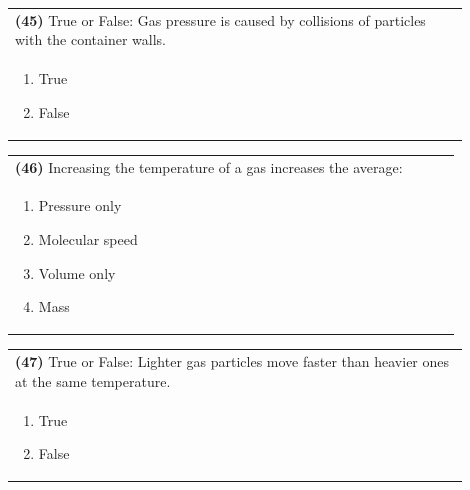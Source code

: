 \documentclass{article}
\begin{document}
\newpage

\noindent\begin{tabular}{|p{0.9\linewidth}|}
\hline
\textbf{(45)} True or False: Gas pressure is caused by collisions of particles with the container walls.\\[0.2cm]

\begin{minipage}[t]{0.85\linewidth}
\begin{enumerate}[label=\alph*.]
\item True
\item False
\end{enumerate}
\end{minipage}\\[0.2cm]
\hline
\end{tabular}

\vspace{0.2cm}
\noindent\begin{tabular}{|p{0.9\linewidth}|}
\hline
\textbf{(46)} Increasing the temperature of a gas increases the average:\\[0.2cm]

\begin{minipage}[t]{0.85\linewidth}
\begin{enumerate}[label=\alph*.]
\item Pressure only
\item Molecular speed
\item Volume only
\item Mass
\end{enumerate}
\end{minipage}\\[0.2cm]
\hline
\end{tabular}

\vspace{0.2cm}
\noindent\begin{tabular}{|p{0.9\linewidth}|}
\hline
\textbf{(47)} True or False: Lighter gas particles move faster than heavier ones at the same temperature.\\[0.2cm]

\begin{minipage}[t]{0.85\linewidth}
\begin{enumerate}[label=\alph*.]
\item True
\item False
\end{enumerate}
\end{minipage}\\[0.2cm]
\hline
\end{tabular}
\end{document}
